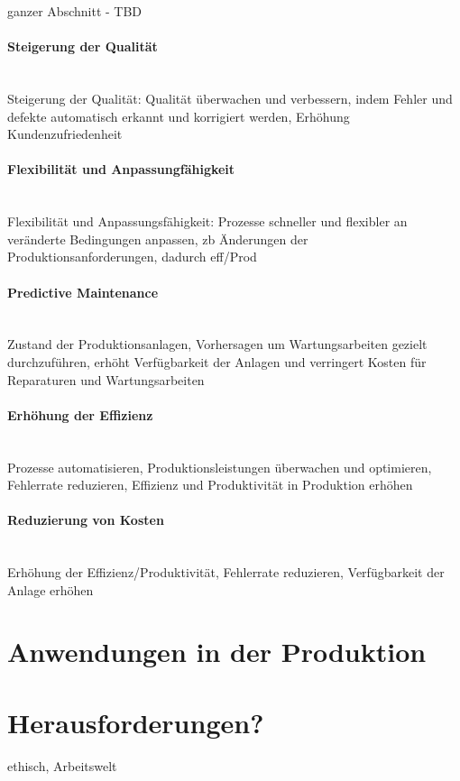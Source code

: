 \documentclass[a4paper,12pt, german]{report}
\begin{document}
ganzer Abschnitt - TBD 

\paragraph{Steigerung der Qualität} $ $ \\ 
Steigerung der Qualität: Qualität überwachen und verbessern, indem Fehler und defekte automatisch erkannt und korrigiert werden, Erhöhung Kundenzufriedenheit

\paragraph{Flexibilität und Anpassungfähigkeit} $ $ \\ 
Flexibilität und Anpassungsfähigkeit: Prozesse schneller und flexibler an veränderte Bedingungen anpassen, zb Änderungen der Produktionsanforderungen, dadurch eff/Prod

\paragraph{Predictive Maintenance} $ $ \\ 
Zustand der Produktionsanlagen, Vorhersagen um Wartungsarbeiten gezielt durchzuführen, erhöht Verfügbarkeit der Anlagen und verringert Kosten für Reparaturen und Wartungsarbeiten

\paragraph{Erhöhung der Effizienz} $ $ \\ 
Prozesse automatisieren, Produktionsleistungen überwachen und optimieren, Fehlerrate reduzieren, Effizienz und Produktivität in Produktion erhöhen

\paragraph{Reduzierung von Kosten} $ $ \\ 
Erhöhung der Effizienz/Produktivität, Fehlerrate reduzieren, Verfügbarkeit der Anlage erhöhen


\section{Anwendungen in der Produktion}




\section{Herausforderungen?}
ethisch, Arbeitswelt
\end{document}
